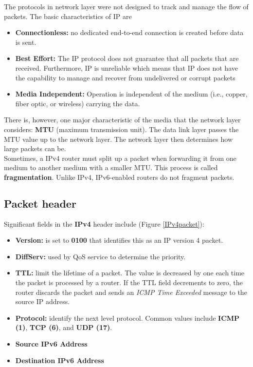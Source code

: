 The protocols in network layer were not designed to track and manage the flow of packets. The basic characteristics of IP are

\begin{itemize}
\item \textbf{Connectionless:} no dedicated end-to-end connection is created before data is sent. 
\item \textbf{Best Effort:} The IP protocol does not guarantee that all packets that are received. Furthermore, IP is unreliable which means that IP does not have the capability to manage and recover from undelivered or corrupt packets
\item \textbf{Media Independent:} Operation is independent of the medium (i.e., copper, fiber optic, or wireless) carrying the data.
\end{itemize}

There is, however, one major characteristic of the media that the network layer considers: \textbf{MTU} (maximum transmission unit). The data link layer passes the MTU value up to the network layer. The network layer then determines how large packets can be.\\

Sometimes, a IPv4 router must split up a packet when forwarding it from one medium to another medium with a smaller MTU. This process is called \textbf{fragmentation}. Unlike IPv4, IPv6-enabled routers do not fragment packets.

\subsection{Packet header}

Significant fields in the \textbf{IPv4} header include (Figure \ref{IPv4packet}):

\begin{itemize}
\item \textbf{Version:} is set to \textbf{0100} that identifies this as an IP version 4 packet.

\item \textbf{DiffServ:} used by QoS service to determine the priority.

\item \textbf{TTL:} limit the lifetime of a packet. The value is decreased by one each time the packet is processed by a router. If the TTL field decrements to zero, the router discards the packet and sends an \emph{ICMP Time Exceeded} message to the source IP address.

\item \textbf{Protocol:} identify the next level protocol. Common values include \textbf{ICMP (1)}, \textbf{TCP (6)}, and \textbf{UDP (17)}.

\item \textbf{Source IPv6 Address}

\item \textbf{Destination IPv6 Address}
\end{itemize}

